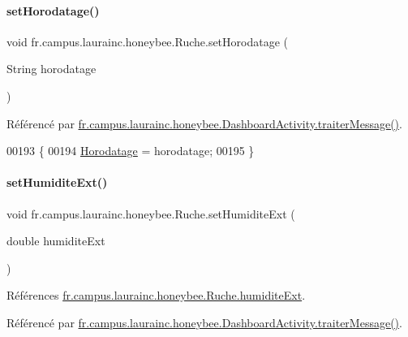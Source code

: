 \paragraph{\texorpdfstring{set\+Horodatage()}{setHorodatage()}}
{\footnotesize\ttfamily void fr.\+campus.\+laurainc.\+honeybee.\+Ruche.\+set\+Horodatage (\begin{DoxyParamCaption}\item[{String}]{horodatage }\end{DoxyParamCaption})}



Référencé par \hyperlink{classfr_1_1campus_1_1laurainc_1_1honeybee_1_1_dashboard_activity_a50d4c14e993ff1779ae5dce8cee11216}{fr.\+campus.\+laurainc.\+honeybee.\+Dashboard\+Activity.\+traiter\+Message()}.


\begin{DoxyCode}
00193                                                  \{
00194         \hyperlink{classfr_1_1campus_1_1laurainc_1_1honeybee_1_1_ruche_af4135c56131bb6afd191538b12c298d7}{Horodatage} = horodatage;
00195     \}
\end{DoxyCode}
\mbox{\label{classfr_1_1campus_1_1laurainc_1_1honeybee_1_1_ruche_a7d9bd771e570edc523ae02fe574676f3}} 
\paragraph{\texorpdfstring{set\+Humidite\+Ext()}{setHumiditeExt()}}
{\footnotesize\ttfamily void fr.\+campus.\+laurainc.\+honeybee.\+Ruche.\+set\+Humidite\+Ext (\begin{DoxyParamCaption}\item[{double}]{humidite\+Ext }\end{DoxyParamCaption})}



Références \hyperlink{classfr_1_1campus_1_1laurainc_1_1honeybee_1_1_ruche_affacf72018828f470b5c69c1cc4f06a6}{fr.\+campus.\+laurainc.\+honeybee.\+Ruche.\+humidite\+Ext}.



Référencé par \hyperlink{classfr_1_1campus_1_1laurainc_1_1honeybee_1_1_dashboard_activity_a50d4c14e993ff1779ae5dce8cee11216}{fr.\+campus.\+laurainc.\+honeybee.\+Dashboard\+Activity.\+traiter\+Message()}.


